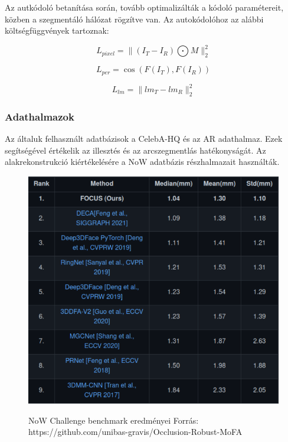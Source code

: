 \documentclass[12pt,a4]{article}
\begin{document}
         	      Az autkódoló betanítása során, tovább optimalizálták a kódoló paramétereit, 
                közben a szegmentáló hálózat rögzítve van. Az autokódolóhoz az alábbi költségfüggvények tartoznak:
        
                \begin{equation*}
                    L_{pixel} = \parallel (I_{T} − I_{R}) \bigodot M \parallel _{2}^{2} 
                \end{equation*}
                
                \begin{equation*}
                    L_{per} = \cos(F(I_{T}), F(I_{R}))    
                \end{equation*}
                
                \begin{equation*}
                    L_{lm} = \parallel lm_{T} - lm_{R} \parallel _{2}^{2}  
                \end{equation*}
            \subsubsection{Adathalmazok}
            
             	Az általuk felhasznált adatbázisok a CelebA-HQ és az AR adathalmaz.
             	Ezek segítségével értékelik az illesztés és az arcszegmentlás hatékonyságát.
             	Az alakrekonstrukció kiértékelésére a NoW adatbázis
             	részhalmazait használták.
     	
             	\begin{figure}[h!]	
             		\centering
             		\includegraphics[width=1\linewidth]{now}
             		\label{fig:now}
             		\caption{NoW Challenge benchmark eredményei
             			Forrás: https://github.com/unibas-gravis/Occlusion-Robust-MoFA}
             	\end{figure} 
              
\end{document}
